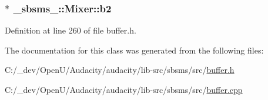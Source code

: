 \subsubsection[{\texorpdfstring{b2}{b2}}]{$\ast$ \+\_\+sbsms\+\_\+\+::\+Mixer\+::b2\hspace{0.3cm}{\ttfamily [protected]}}\hypertarget{class__sbsms___1_1_mixer_af5b3c0577c3e53a7e5c0bea9955afb22}{}\label{class__sbsms___1_1_mixer_af5b3c0577c3e53a7e5c0bea9955afb22}


Definition at line 260 of file buffer.\+h.



The documentation for this class was generated from the following files\+:\begin{DoxyCompactItemize}
\item 
C\+:/\+\_\+dev/\+Open\+U/\+Audacity/audacity/lib-\/src/sbsms/src/\hyperlink{sbsms_2src_2buffer_8h}{buffer.\+h}\item 
C\+:/\+\_\+dev/\+Open\+U/\+Audacity/audacity/lib-\/src/sbsms/src/\hyperlink{buffer_8cpp}{buffer.\+cpp}\end{DoxyCompactItemize}
